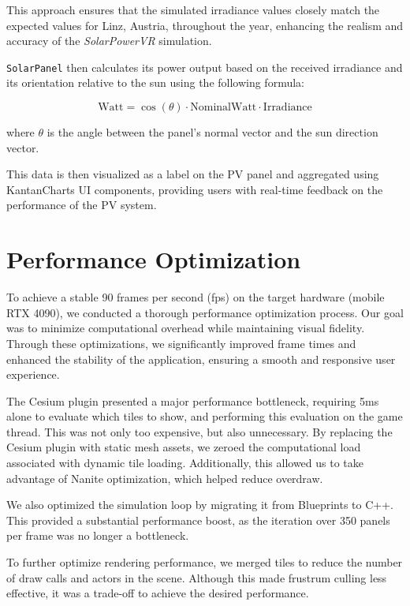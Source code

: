 \documentclass[draft, final]{vutinfth} %
\begin{document}
This approach ensures that the simulated irradiance values closely match the expected values for Linz, Austria, throughout the year, enhancing the realism and accuracy of the \textit{SolarPowerVR} simulation.

\lstinline|SolarPanel| then calculates its power output based on the received irradiance and its orientation relative to the sun using the following formula:

\begin{equation}
    \text{Watt} = \cos(\theta) \cdot \text{NominalWatt} \cdot \text{Irradiance}
\end{equation}

where $\theta$ is the angle between the panel's normal vector and the sun direction vector.

This data is then visualized as a label on the PV panel and aggregated using KantanCharts UI components, providing users with real-time feedback on the performance of the PV system.

\section{Performance Optimization}

To achieve a stable 90 frames per second (fps) on the target hardware (mobile RTX 4090), we conducted a thorough performance optimization process. Our goal was to minimize computational overhead while maintaining visual fidelity. Through these optimizations, we significantly improved frame times and enhanced the stability of the application, ensuring a smooth and responsive user experience.

The Cesium plugin presented a major performance bottleneck, requiring 5ms alone to evaluate which tiles to show, and performing this evaluation on the game thread. This was not only too expensive, but also unnecessary. By replacing the Cesium plugin with static mesh assets, we zeroed the computational load associated with dynamic tile loading. Additionally, this allowed us to take advantage of Nanite optimization, which helped reduce overdraw.

We also optimized the simulation loop by migrating it from Blueprints to C++. This provided a substantial performance boost, as the iteration over 350 panels per frame was no longer a bottleneck.

To further optimize rendering performance, we merged tiles to reduce the number of draw calls and actors in the scene. Although this made frustrum culling less effective, it was a trade-off to achieve the desired performance.
\end{document}
